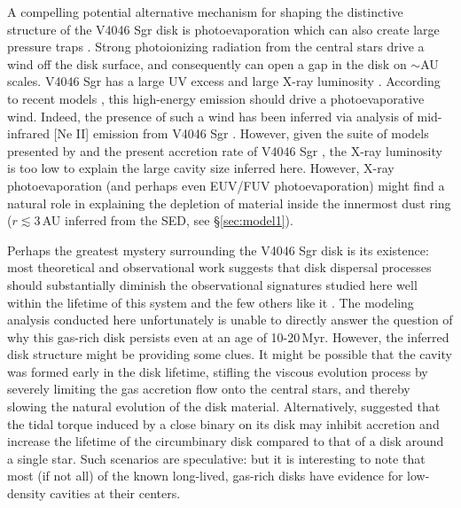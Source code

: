 {A compelling potential alternative mechanism for shaping the distinctive 
structure of the V4046 Sgr disk is photoevaporation \citep{hollenbach94,
clarke01,alexander06a,alexander06b,owen12} which can also create large pressure 
traps \citep{alexander07}.  Strong photoionizing radiation from the central 
stars drive a wind off the disk surface, and consequently can open a gap in the 
disk on $\sim$AU scales.  V4046 Sgr has a large UV excess \citep{delareza86,
hutchinson90,huenemoerder07} and large X-ray luminosity 
\citep[$L_X \sim (7-10)\times 10^{29}$\,erg s$^{-1}$, based on archival XMM 
data; see also][]{gunther06,argiroffi12}.  According to recent models
\citep{gorti09a,gorti09b,owen10,owen11}, this high-energy emission should drive 
a photoevaporative wind.  Indeed, the presence of such a wind has been 
inferred via analysis of mid-infrared [Ne II] emission from V4046 Sgr 
\citep{sacco12}.  However, given the suite of models presented by 
\citet{owen11} and the present accretion rate of V4046 Sgr \cite[$\log\dot{M}
= -9.3\pm0.3$\,M$_\odot$ yr$^{-1}$;][]{donati11,curran11}, the X-ray luminosity 
is too low to explain the large cavity size inferred here.  However, X-ray 
photoevaporation (and perhaps even EUV/FUV photoevaporation) might find a 
natural role in explaining the depletion of material inside the innermost dust 
ring ($r \lesssim 3$\,AU inferred from the SED, see \S\ref{sec:model1}).

Perhaps the greatest mystery surrounding the V4046 Sgr disk is its existence: 
most theoretical and observational work suggests that disk dispersal processes 
should substantially diminish the observational signatures studied here well 
within the lifetime of this system and the few others like it \citep{clarke01,
alexander06b,takeuchi05,currie07,currie09}.  The modeling analysis 
conducted here unfortunately is unable to directly answer the question of why 
this gas-rich disk persists even at an age of 10-20\,Myr.  However, the inferred
disk structure might be providing some clues.  It might be possible that the 
cavity was formed early in the disk lifetime, stifling the viscous evolution 
process by severely limiting the gas accretion flow onto the central stars, and
thereby slowing the natural evolution of the disk material.  Alternatively, 
\citet{alexander12} suggested that the tidal torque induced by a close binary 
on its disk may inhibit accretion and increase the lifetime of the circumbinary 
disk compared to that of a disk around a single star. Such scenarios are 
speculative: but it is interesting to note that most (if not all) of the known 
long-lived, gas-rich disks have evidence for low-density cavities at their 
centers.

}

